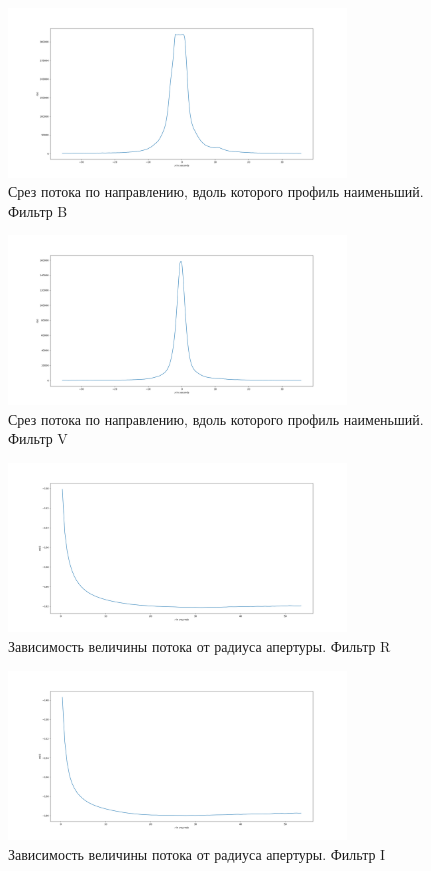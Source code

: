 \documentclass [12pt, a4paper] {article}
\theoremstyle{definition}
\begin{document}
		\begin{figure}
		\centering
			\includegraphics[width = 0.8\textwidth]{B_slice_min.png}
						\caption{Срез потока по направлению, вдоль которого профиль наименьший. Фильтр B}
					\end{figure}
		\begin{figure}
		\centering
			\includegraphics[width = 0.8\textwidth]{V_slice_min.png}
			\caption{Срез потока по направлению, вдоль которого профиль наименьший. Фильтр V}
\end{figure}
\begin{figure}
		\centering
			\includegraphics[width = 0.8\textwidth]{R_slice_I(R).png}
			\caption{Зависимость величины потока от радиуса апертуры. Фильтр R}
		\end{figure}
		\begin{figure}
		\centering
			\includegraphics[width = 0.8\textwidth]{I_slice_I(R).png}
						\caption{Зависимость величины потока от радиуса апертуры. Фильтр I}
		\end{figure}
\end{document}
